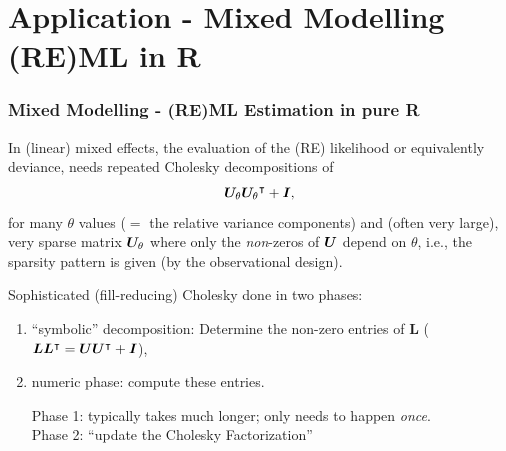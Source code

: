 \documentclass[dvipsnames,pdflatex,beamer]{beamer}
\begin{document}





\section{Application - Mixed Modelling (RE)ML in R}\label{sec:lmer}
\begin{frame}\frametitle{Mixed Modelling - (RE)ML Estimation in pure R}
In (linear) mixed effects, the evaluation of the (RE)
likelihood or equivalently deviance, needs repeated Cholesky decompositions
of
\begin{equation}
  \label{eq:U'U+I}
  \bm{U}_\theta \bm{U}_\theta{}^{\intercal} + \bm{I},
\end{equation}
for many $\theta$ values ($=$ the relative variance components)
and (often very large), very sparse matrix
$\bm{U}_\theta$ where only the \emph{non}-zeros of $\bm{U}$ depend on $\theta$,
i.e., the sparsity pattern is given (by the observational design).

Sophisticated (fill-reducing) Cholesky done in two phases:
\begin{enumerate}
\item ``symbolic'' decomposition: Determine the non-zero entries of $\bm L$
  ($\bm L {\bm L}{}^{\intercal} = \bm{U} \bm{U}{}^{\intercal} + \bm{I}$),
\item numeric phase: compute these entries.

Phase 1: typically takes much longer; only needs to happen \emph{once}.\\
Phase 2: ``update the Cholesky Factorization''
\end{enumerate}
\end{frame}

\end{document}
